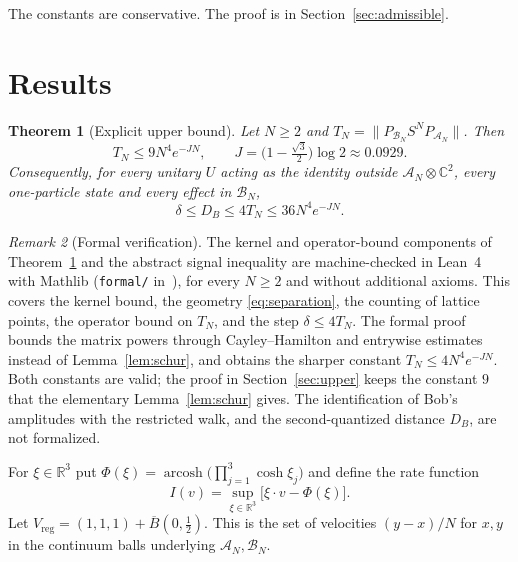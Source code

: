 \documentclass[11pt]{amsart}
\newtheorem{theorem}{Theorem}[section]
\theoremstyle{definition}
\theoremstyle{remark}
\newtheorem{remark}[theorem]{Remark}
\newcommand{\R}{\mathbb{R}}
\newcommand{\C}{\mathbb{C}}
\newcommand{\cA}{\mathcal{A}}
\newcommand{\cB}{\mathcal{B}}
\newcommand{\arcosh}{\operatorname{arcosh}}
\begin{document}
The constants are conservative.  The proof is in Section~\ref{sec:admissible}.

\section{Results}\label{sec:results}

\begin{theorem}[Explicit upper bound]\label{thm:upper}
Let $N\ge2$ and $T_N=\|P_{\cB_N}S^NP_{\cA_N}\|$.  Then
\[
T_N\le9N^4e^{-JN},\qquad J=\bigl(1-\tfrac{\sqrt3}2\bigr)\log2\approx0.0929 .
\]
Consequently, for every unitary $U$ acting as the identity outside
$\cA_N\otimes\C^2$, every one-particle state and every effect in $\cB_N$,
\[
\delta\le D_B\le4T_N\le36N^4e^{-JN}.
\]
\end{theorem}

\begin{remark}[Formal verification]
The kernel and operator-bound components of Theorem~\ref{thm:upper}
and the abstract signal inequality are machine-checked in Lean~4 with Mathlib
(\texttt{formal/} in~\cite{Repo}), for every $N\ge2$ and without
additional axioms.  This covers the kernel bound, the geometry
\eqref{eq:separation}, the counting of lattice points, the operator bound on
$T_N$, and the step $\delta\le4T_N$.  The formal proof bounds the matrix
powers through Cayley--Hamilton and entrywise estimates instead of
Lemma~\ref{lem:schur}, and obtains the sharper constant
$T_N\le4N^4e^{-JN}$.  Both constants are valid; the proof in
Section~\ref{sec:upper} keeps the constant $9$ that the elementary
Lemma~\ref{lem:schur} gives.  The identification of Bob's amplitudes with the
restricted walk, and the second-quantized distance $D_B$, are not
formalized.
\end{remark}

For $\xi\in\R^3$ put $\Phi(\xi)=\arcosh\bigl(\prod_{j=1}^3\cosh\xi_j\bigr)$
and define the rate function
\begin{equation}\label{eq:rate}
I(v)=\sup_{\xi\in\R^3}\bigl[\xi\cdot v-\Phi(\xi)\bigr].
\end{equation}
Let $V_{\mathrm{reg}}=(1,1,1)+\overline B(0,\tfrac12)$.  This is the set of
velocities $(y-x)/N$ for $x,y$ in the continuum balls underlying
$\cA_N,\cB_N$.
\end{document}
